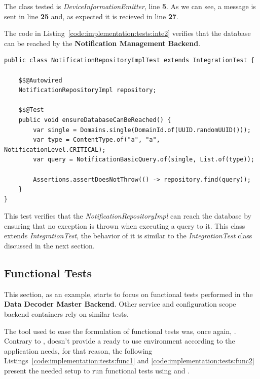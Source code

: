 The class tested is \textit{DeviceInformationEmitter}, line \textbf{5}. As we can see, a message is sent in line \textbf{25} and, as expected it is recieved in line \textbf{27}.

The code in Listing~\ref{code:implementation:tests:inte2} verifies that the database can be reached by the \textbf{Notification Management Backend}.

\begin{lstlisting}[style=Java, caption=Integration Test - Database - \textbf{Notification Management Backend}, label={code:implementation:tests:inte2}]
public class NotificationRepositoryImplTest extends IntegrationTest {

    $$@Autowired
    NotificationRepositoryImpl repository;

    $$@Test
    public void ensureDatabaseCanBeReached() {
        var single = Domains.single(DomainId.of(UUID.randomUUID()));
        var type = ContentType.of("a", "a", NotificationLevel.CRITICAL);
        var query = NotificationBasicQuery.of(single, List.of(type));

        Assertions.assertDoesNotThrow(() -> repository.find(query));
    }
}
\end{lstlisting}

This test verifies that the \textit{NotificationRepositoryImpl} can reach the database by ensuring that no exception is thrown when executing a query to it. This class extends \textit{IntegrationTest}, the behavior of it is similar to the \textit{IntegrationTest} class discussed in the next section.

\subsection{Functional Tests}
\label{subsec:implementation:tests:functional}

This section, as an example, starts to focus on functional tests performed in the \textbf{Data Decoder Master Backend}. Other service and configuration scope backend containers rely on similar tests.

The tool used to ease the formulation of functional tests was, once again, . Contrary to ,  doesn't provide a ready to use environment according to the application needs, for that reason, the following Listings~\ref{code:implementation:tests:func1} and \ref{code:implementation:tests:func2} present the needed setup to run functional tests using  and .

